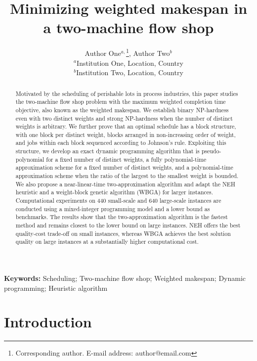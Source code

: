\documentclass[12pt]{article} \textheight=24.5cm \textwidth=16.5cm \parskip = 0.165cm
\title{\LARGE\bf Minimizing weighted makespan in a two-machine flow shop}
\author{Author One$^{a,}$\footnote{Corresponding author. E-mail address: author@email.com}, Author Two$^{b}$\\
    {\small $^{a}$Institution One, Location, Country}\\
    {\small $^{b}$Institution Two, Location, Country}\\}
\date{}
\let\origsection\section
\renewcommand{\section}{\FloatBarrier\origsection}
\begin{document}
    \begin{sloppypar}
        
        \maketitle
        
        \begin{abstract}
            Motivated by the scheduling of perishable lots in process industries, this paper studies the two-machine flow shop problem with the maximum weighted completion time objective, also known as the weighted makespan.
            We establish binary NP-hardness even with two distinct weights and strong NP-hardness when the number of distinct weights is arbitrary. 
            We further prove that an optimal schedule has a block structure, with one block per distinct weight, blocks arranged in non-increasing order of weight, and jobs within each block sequenced according to Johnson's rule. 
            Exploiting this structure, we develop an exact dynamic programming algorithm that is pseudo-polynomial for a fixed number of distinct weights, a fully polynomial-time approximation scheme for a fixed number of distinct weights, and a polynomial-time approximation scheme when the ratio of the largest to the smallest weight is bounded. 
            We also propose a near-linear-time two-approximation algorithm and adapt the NEH heuristic and a weight-block genetic algorithm (WBGA) for larger instances. 
            Computational experiments on 440 small-scale and 640 large-scale instances are conducted using a mixed-integer programming model and a lower bound as benchmarks. 
            The results show that the two-approximation algorithm is the fastest method and remains closest to the lower bound on large instances. NEH offers the best quality-cost trade-off on small instances, whereas WBGA achieves the best solution quality on large instances at a substantially higher computational cost.
        \end{abstract}
        
        \noindent \textbf{Keywords:} Scheduling; Two-machine flow shop; Weighted makespan; Dynamic programming; Heuristic algorithm
        
        \section{Introduction} \label{sec:intro}
        

\end{sloppypar}
\end{document}
